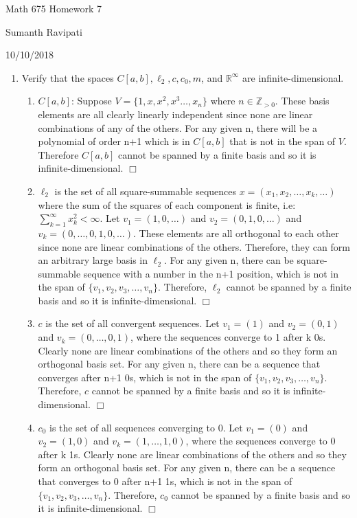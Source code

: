 \documentclass[12pt,letterpaper,reqno]{amsart}
\newcommand{\R}{\mathbb R}
\newcommand{\Z}{\mathbb Z}
\begin{document}
\thispagestyle{empty}
\centerline{\Large Math 675 Homework 7}
\centerline{Sumanth Ravipati}
\centerline{10/10/2018}
\vspace{.15in}

\begin{enumerate}[1.]
\item Verify that the spaces $C[a,b], \ell_2, c, c_0, m$, and $\R^\infty$ are infinite-dimensional.
    \begin{enumerate}
        \item $C[a,b]$: Suppose $V = \{1, x, x^2, x^3 \ldots, x_n\}$ where $n \in \Z_{>0}$. These basis elements are all clearly linearly independent since none are linear combinations of any of the others. For any given n, there will be a polynomial of order n+1 which is in $C[a,b]$ that is not in the span of $V$. Therefore $C[a,b]$ cannot be spanned by a finite basis and so it is infinite-dimensional. $\Box$
        \item $\ell_2$ is the set of all square-summable sequences $x = (x_1, x_2, \ldots, x_k, \ldots)$ where the sum of the squares of each component is finite, i.e: $\sum\limits_{k=1}^\infty x_k^2 < \infty$. Let $v_1 = (1, 0, \ldots)$ and $v_2 = (0, 1, 0, \ldots)$ and $v_k = (0, \ldots, 0, 1, 0, \ldots)$. These elements are all orthogonal to each other since none are linear combinations of the others. Therefore, they can form an arbitrary large basis in $\ell_2$. For any given n, there can be square-summable sequence with a number in the n+1 position, which is not in the span of $\{v_1, v_2, v_3, \ldots, v_n\}$. Therefore, $\ell_2$ cannot be spanned by a finite basis and so it is infinite-dimensional. $\Box$
        \item $c$ is the set of all convergent sequences. Let $v_1 = (1)$ and $v_2 = (0, 1)$ and $v_k = (0, \ldots, 0, 1)$, where the sequences converge to 1 after k 0s. Clearly none are linear combinations of the others and so they form an orthogonal basis set. For any given n, there can be a sequence that converges after n+1 0s, which is not in the span of $\{v_1, v_2, v_3, \ldots, v_n\}$. Therefore, $c$ cannot be spanned by a finite basis and so it is infinite-dimensional. $\Box$
        \item $c_0$ is the set of all sequences converging to 0. Let $v_1 = (0)$ and $v_2 = (1, 0)$ and $v_k = (1, \ldots, 1, 0)$, where the sequences converge to 0 after k 1s. Clearly none are linear combinations of the others and so they form an orthogonal basis set. For any given n, there can be a sequence that converges to 0 after n+1 1s, which is not in the span of $\{v_1, v_2, v_3, \ldots, v_n\}$. Therefore, $c_0$ cannot be spanned by a finite basis and so it is infinite-dimensional. $\Box$

\end{enumerate}
\end{enumerate}
\end{document}
